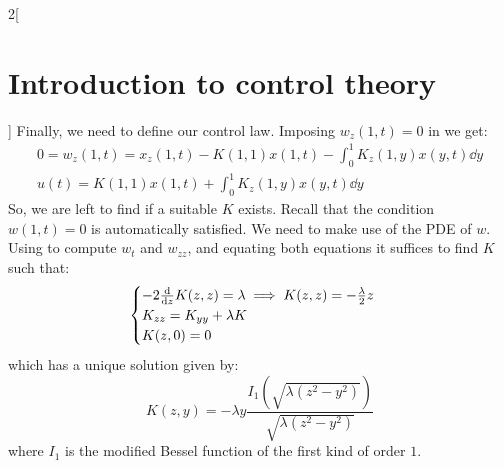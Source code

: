 \documentclass[../../../main_math.tex]{subfiles}
\begin{document}
\begin{multicols}{2}[\section{Introduction to control theory}]
  Finally, we need to define our control law. Imposing $w_z(1,t)=0$ in  we get:
  \begin{gather*}
    0=w_z(1,t)=x_z(1,t)-K(1,1)x(1,t)-\int_0^1 K_z(1,y)x(y,t)\dd y\\
    u(t)=K(1,1)x(1,t)+\int_0^1 K_z(1,y)x(y,t)\dd y
  \end{gather*}
  So, we are left to find if a suitable $K$ exists. Recall that the condition $w(1,t)=0$ is automatically satisfied. We need to make use of the PDE of $w$. Using  to compute $w_t$ and $w_{zz}$, and equating both equations it suffices to find $K$ such that:
  $$
    \begin{cases}
      -2\dv{}{z}K(z,z)=\lambda\implies K(z,z)=-\frac{\lambda}{2}z \\
      K_{zz}=K_{yy}+\lambda K                                     \\
      K(z,0)=0
    \end{cases}
  $$
  which has a unique solution given by:
  $$
    K(z,y)=-\lambda y\frac{I_1(\sqrt{\lambda(z^2-y^2)})}{\sqrt{\lambda(z^2-y^2)}}
  $$
  where $I_1$ is the modified Bessel function of the first kind of order $1$.
\end{multicols}
\end{document}

